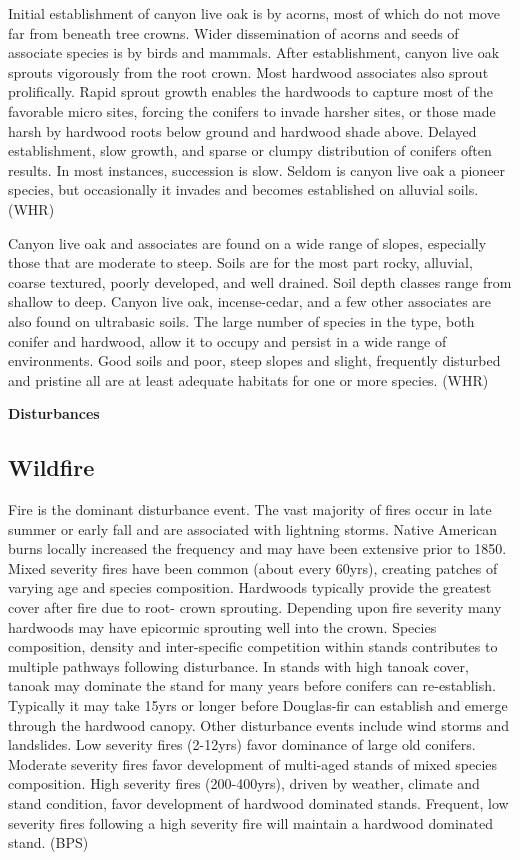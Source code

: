 \documentclass{article}
\begin{document}
Initial establishment of canyon live oak is by acorns, most of which do not move far from beneath tree crowns. Wider dissemination of acorns and seeds of associate species is by birds and mammals. After establishment, canyon live oak sprouts vigorously from the root crown. Most hardwood associates also sprout prolifically. Rapid sprout growth enables the hardwoods to capture most of the favorable micro sites, forcing the conifers to invade harsher sites, or those made harsh by hardwood roots below ground and hardwood shade above. Delayed establishment, slow growth, and sparse or clumpy distribution of conifers often results. In most instances, succession is slow. Seldom is canyon live oak a pioneer species, but occasionally it invades and becomes established on alluvial soils.  (WHR)

Canyon live oak and associates are found on a wide range of slopes, especially those that are moderate to steep. Soils are for the most part rocky, alluvial, coarse textured, poorly developed, and well drained. Soil depth classes range from shallow to deep. Canyon live oak, incense-cedar, and a few other associates are also found on ultrabasic soils. The large number of species in the type, both conifer and hardwood, allow it to occupy and persist in a wide range of environments. Good soils and poor, steep slopes and slight, frequently disturbed and pristine all are at least adequate habitats for one or more species. (WHR)

\begin{snugshade}\Large \textbf{Disturbances} \end{snugshade}

\subsection*{Wildfire}
Fire is the dominant disturbance event. The vast majority of fires occur in late summer or early fall and are associated with lightning storms. Native American burns locally increased the frequency and may have been extensive prior to 1850. Mixed severity fires have been common (about every 60yrs), creating patches of varying age and species composition. Hardwoods typically provide the greatest cover after fire due to root- crown sprouting. Depending upon fire severity many hardwoods may have epicormic sprouting well into the crown. Species composition, density and inter-specific competition within stands contributes to multiple pathways following disturbance. In stands with high tanoak cover, tanoak may dominate the stand for many years before conifers can re-establish. Typically it may take 15yrs or longer before Douglas-fir can establish and emerge through the hardwood canopy. Other disturbance events include wind storms and landslides. Low severity fires (2-12yrs) favor dominance of large old conifers. Moderate severity fires favor development of multi-aged stands of mixed species composition. High severity fires (200-400yrs), driven by weather, climate and stand condition, favor development of hardwood dominated stands. Frequent, low severity fires following a high severity fire will maintain a hardwood dominated stand. (BPS)
\end{document}
